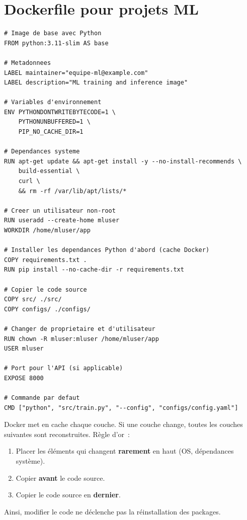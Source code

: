 \section{Dockerfile pour projets ML}
\label{sec:dockerfile-ml}

\begin{codeblock}[title=\textbf{Dockerfile ML complet}]
\begin{verbatim}
# Image de base avec Python
FROM python:3.11-slim AS base

# Metadonnees
LABEL maintainer="equipe-ml@example.com"
LABEL description="ML training and inference image"

# Variables d'environnement
ENV PYTHONDONTWRITEBYTECODE=1 \
    PYTHONUNBUFFERED=1 \
    PIP_NO_CACHE_DIR=1

# Dependances systeme
RUN apt-get update && apt-get install -y --no-install-recommends \
    build-essential \
    curl \
    && rm -rf /var/lib/apt/lists/*

# Creer un utilisateur non-root
RUN useradd --create-home mluser
WORKDIR /home/mluser/app

# Installer les dependances Python d'abord (cache Docker)
COPY requirements.txt .
RUN pip install --no-cache-dir -r requirements.txt

# Copier le code source
COPY src/ ./src/
COPY configs/ ./configs/

# Changer de proprietaire et d'utilisateur
RUN chown -R mluser:mluser /home/mluser/app
USER mluser

# Port pour l'API (si applicable)
EXPOSE 8000

# Commande par defaut
CMD ["python", "src/train.py", "--config", "configs/config.yaml"]
\end{verbatim}
\end{codeblock}

\begin{bonnepratique}[title=\textbf{Ordre des instructions et cache}]
Docker met en cache chaque couche. Si une couche change, toutes les couches
suivantes sont reconstruites. R\`egle d'or~:
\begin{enumerate}
  \item Placer les \'el\'ements qui changent \textbf{rarement} en haut
    (OS, d\'ependances syst\`eme).
  \item Copier \file{requirements.txt} \textbf{avant} le code source.
  \item Copier le code source en \textbf{dernier}.
\end{enumerate}
Ainsi, modifier le code ne d\'eclenche pas la r\'einstallation des packages.
\end{bonnepratique}

